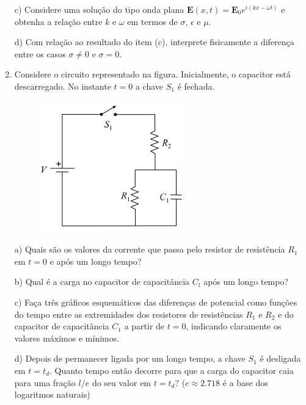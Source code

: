 \begin{enumerate}[start=1,label={\bfseries Q\arabic*.}]
\resposta

c) Considere uma solução do tipo onda plana $\mathbf{E}(x,t) = \mathbf{E}_{0} e^{i(kx - \omega t)}$ e obtenha a relação entre $k$ e $\omega$ em termos de $\sigma$, $\epsilon$ e $\mu$.

\resposta

d) Com relação ao resultado do item (c), interprete fisicamente a diferença entre os casos $\sigma \neq 0$ e $\sigma = 0$.

\resposta




\item Considere o circuito representado na figura. Inicialmente, o capacitor está descarregado. No instante $t=0$ a chave $S_{1}$ é fechada.

\begin{figure}[H]
\centering
\includegraphics[scale=1]{eletromag-img/quadrada.png}
\end{figure}


a) Quais são os valores da corrente que passa pelo resistor de resistência $R_{1}$ em $t = 0$ e após um longo tempo?

\resposta

b) Qual é a carga no capacitor de capacitância $C_{l}$ após um longo tempo?

\resposta

c) Faça três gráficos esquemáticos das diferenças de potencial como funções do tempo entre as extremidades dos resistores de resistências $R_{1}$ e $R_{2}$ e do capacitor de capacitância $C_{1}$ a partir de $t = 0$, indicando claramente os valores máximos e mínimos.

\resposta

d) Depois de permanecer ligada por um longo tempo, a chave $S_{1}$ é desligada em $t = t_{d}$. Quanto tempo então decorre para que a carga do capacitor caia para uma fração $l/e$ do seu valor em $t = t_{d}$? ($e \approx 2.718$ é a base dos logaritmos naturais)


\end{enumerate}
